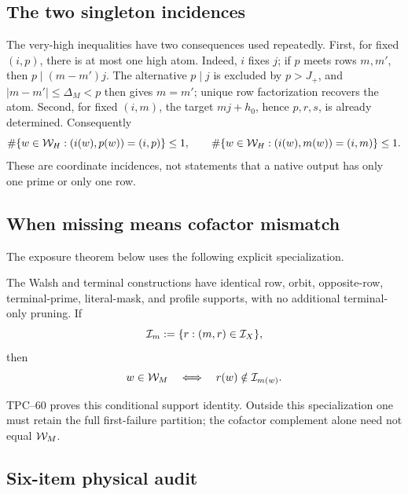 \subsection{The two singleton incidences}

The very-high inequalities have two consequences used repeatedly.  First,
for fixed \((i,p)\), there is at most one high atom.  Indeed, \(i\) fixes
\(j\); if \(p\) meets rows \(m,m'\), then
\(p\mid(m-m')j\).  The alternative \(p\mid j\) is excluded by
\(p>J_+\), and \(|m-m'|\le\Delta_M<p\) then gives \(m=m'\); unique row
factorization recovers the atom.  Second, for fixed \((i,m)\), the target
\(mj+h_0\), hence \(p,r,s\), is already determined.  Consequently
\begin{equation}
 \#\{w\in\mathcal W_H:(i(w),p(w))=(i,p)\}\le1,
 \qquad
 \#\{w\in\mathcal W_H:(i(w),m(w))=(i,m)\}\le1.
 \label{eq:tpc61-ip-im-singletons}
\end{equation}
These are coordinate incidences, not statements that a native output has
only one prime or only one row.

\subsection{When missing means cofactor mismatch}

The exposure theorem below uses the following explicit specialization.
\begin{definition}
\label{def:tpc61-identical-support}
The Walsh and terminal constructions have identical row, orbit,
opposite-row, terminal-prime, literal-mask, and profile supports, with no
additional terminal-only pruning.  If
\begin{equation}
 \mathcal I_m:=\{r:(m,r)\in\mathcal I_X\},
 \label{eq:tpc61-retained-cofactor-row}
\end{equation}
then
\begin{equation}
 w\in\mathcal W_M
 \quad\Longleftrightarrow\quad
 r(w)\notin\mathcal I_{m(w)}.
 \label{eq:tpc61-missing-iff-cofactor}
\end{equation}
\end{definition}
TPC--60 proves this conditional support identity.  Outside this
specialization one must retain the full first-failure partition; the
cofactor complement alone need not equal \(\mathcal W_M\).

\subsection{Six-item physical audit}

